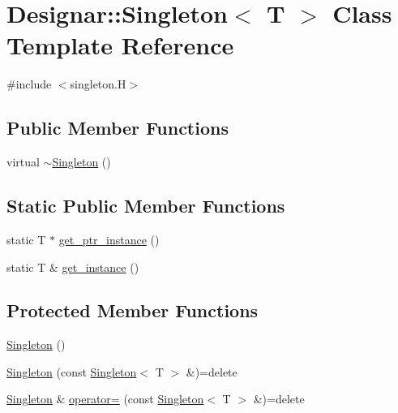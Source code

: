 \hypertarget{class_designar_1_1_singleton}{}\section{Designar\+:\+:Singleton$<$ T $>$ Class Template Reference}
\label{class_designar_1_1_singleton}


{\ttfamily \#include $<$singleton.\+H$>$}

\subsection*{Public Member Functions}
\begin{DoxyCompactItemize}
\item 
virtual \hyperlink{class_designar_1_1_singleton_abf7976824a492dd42ed608bcafb8d98d}{$\sim$\+Singleton} ()
\end{DoxyCompactItemize}
\subsection*{Static Public Member Functions}
\begin{DoxyCompactItemize}
\item 
static T $\ast$ \hyperlink{class_designar_1_1_singleton_a4246f5f346bda552c3f0b317792d2fe5}{get\+\_\+ptr\+\_\+instance} ()
\item 
static T \& \hyperlink{class_designar_1_1_singleton_a747ab94efeaa0d985c194c2f91616075}{get\+\_\+instance} ()
\end{DoxyCompactItemize}
\subsection*{Protected Member Functions}
\begin{DoxyCompactItemize}
\item 
\hyperlink{class_designar_1_1_singleton_ad2cc3d3b4ee614f4dd63bda386638f66}{Singleton} ()
\item 
\hyperlink{class_designar_1_1_singleton_a961a62f81db43d2b610949a76f9645f2}{Singleton} (const \hyperlink{class_designar_1_1_singleton}{Singleton}$<$ T $>$ \&)=delete
\item 
\hyperlink{class_designar_1_1_singleton}{Singleton} \& \hyperlink{class_designar_1_1_singleton_a8968c625d740c01211ec483142e52a58}{operator=} (const \hyperlink{class_designar_1_1_singleton}{Singleton}$<$ T $>$ \&)=delete
\end{DoxyCompactItemize}


